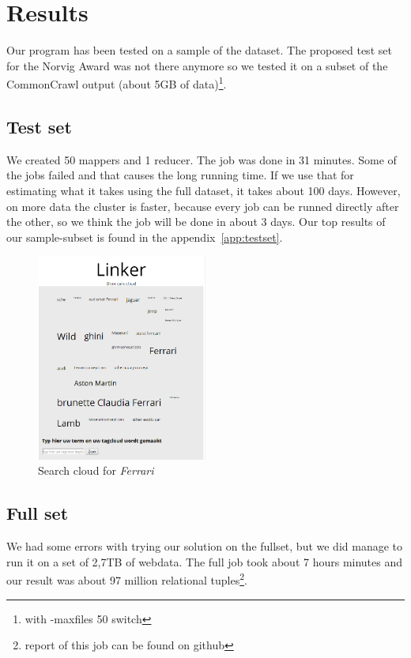 \documentclass{sig-alternate}
\begin{document}
\section{Results}
Our program has been tested on a sample of the dataset. The proposed test set for the Norvig Award  was not there anymore so we tested it on a subset of the CommonCrawl output (about 5GB of data)\footnote{with -maxfiles 50 switch}.

\subsection{Test set} 
We created 50 mappers and 1 reducer. The job was done in 31 minutes. Some of the jobs failed and that causes the long running time. If we use that for estimating what it takes using the full dataset, it takes about 100 days. However, on more data the cluster is faster, because every job can be runned directly after the other, so we think the job will be done in about 3 days. Our top results of our sample-subset is found in the appendix~\ref{app:testset}.

\begin{figure}[t]
	\label{img:screenSearch}
	\centering
	   \includegraphics[width=0.5\textwidth]{screen_search_cloud.png}
	\caption{Search cloud for \emph{Ferrari}}
\end{figure}

\subsection{Full set} 
We had some errors with trying our solution on the fullset, but we did manage to run it on a set of 2,7TB of webdata. The full job took about 7 hours minutes and our result was about 97 million relational tuples\footnote{report of this job can be found on github}.
\end{document}
